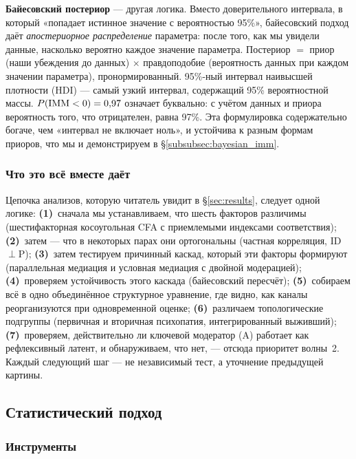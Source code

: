 \textbf{Байесовский постериор} --- другая логика. Вместо доверительного интервала, в который «попадает истинное значение с вероятностью 95\%», байесовский подход даёт \emph{апостериорное распределение} параметра: после того, как мы увидели данные, насколько вероятно каждое значение параметра. Постериор $=$ приор (наши убеждения до данных) $\times$ правдоподобие (вероятность данных при каждом значении параметра), пронормированный. 95\%-ный интервал наивысшей плотности (HDI) --- самый узкий интервал, содержащий 95\% вероятностной массы. $P(\mathrm{IMM} < 0) = 0{,}97$ означает буквально: с учётом данных и приора вероятность того, что \IMM{} отрицателен, равна 97\%. Эта формулировка содержательно богаче, чем «интервал не включает ноль», и устойчива к разным формам приоров, что мы и демонстрируем в §\ref{subsubsec:bayesian_imm}.

\subsubsection{Что это всё вместе даёт}

Цепочка анализов, которую читатель увидит в §\ref{sec:results}, следует одной логике: \textbf{(1)}~сначала мы устанавливаем, что шесть факторов различимы (шестифакторная косоугольная CFA с приемлемыми индексами соответствия); \textbf{(2)}~затем --- что в некоторых парах они ортогональны (частная корреляция, ID$\perp$P); \textbf{(3)}~затем тестируем причинный каскад, который эти факторы формируют (параллельная медиация и условная медиация с двойной модерацией); \textbf{(4)}~проверяем устойчивость этого каскада (байесовский пересчёт); \textbf{(5)}~собираем всё в одно объединённое структурное уравнение, где видно, как каналы реорганизуются при одновременной оценке; \textbf{(6)}~различаем топологические подгруппы (первичная и вторичная психопатия, интегрированный выживший); \textbf{(7)}~проверяем, действительно ли ключевой модератор (A) работает как рефлексивный латент, и обнаруживаем, что нет, --- отсюда приоритет волны~2. Каждый следующий шаг --- не независимый тест, а уточнение предыдущей картины.

\subsection{Статистический подход}
\label{subsec:stat_approach}

\subsubsection{Инструменты}

